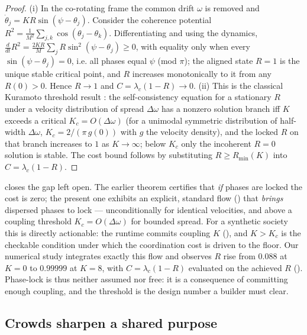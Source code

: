 \documentclass[11pt,twocolumn,a4paper]{article}
\newcommand{\Ord}{R}                 %
\begin{document}
\begin{proof}
(i) In the co-rotating frame the common drift $\omega$ is removed and
$\dot\theta_j=K\Ord\sin(\psi-\theta_j)$. Consider the coherence potential
$\Ord^2=\frac1{M^2}\sum_{j,k}\cos(\theta_j-\theta_k)$. Differentiating and
using the dynamics,
$\frac{d}{dt}\Ord^2=\frac{2K\Ord}{M}\sum_j\Ord\sin^2(\psi-\theta_j)\ge0$,
with equality only when every $\sin(\psi-\theta_j)=0$, i.e. all phases equal
$\psi$ (mod $\pi$); the aligned state $\Ord=1$ is the unique stable
critical point, and $\Ord$ increases monotonically to it from any
$\Ord(0)>0$. Hence $\Ord\to1$ and $C=\lambda_c(1-\Ord)\to0$. (ii) This is
the classical Kuramoto threshold result \cite{strogatz2000,acebron2005}:
the self-consistency equation for a stationary $\Ord$ under a velocity
distribution of spread $\Delta\omega$ has a nonzero solution branch iff
$K$ exceeds a critical $K_c=O(\Delta\omega)$ (for a unimodal symmetric
distribution of half-width $\Delta\omega$, $K_c=2/(\pi \,g(0))$ with $g$ the
velocity density), and the locked $\Ord$ on that branch increases to $1$ as
$K\to\infty$; below $K_c$ only the incoherent $\Ord=0$ solution is stable.
The cost bound follows by substituting $\Ord\ge\Ord_{\min}(K)$ into
$C=\lambda_c(1-\Ord)$.
\end{proof}

\begin{remark}
\label{rem:lock-commitment}
 closes the gap  left open. The
earlier theorem certifies that \emph{if} phases are locked the cost is
zero; the present one exhibits an explicit, standard flow
() that \emph{brings} dispersed phases to lock ---
unconditionally for identical velocities, and above a coupling threshold
$K_c=O(\Delta\omega)$ for bounded spread. For a synthetic society this is
directly actionable: the runtime commits coupling $K$ (), and
$K>K_c$ is the checkable condition under which the coordination cost is
driven to the floor. Our numerical study integrates exactly this flow and
observes $\Ord$ rise from $0.088$ at $K=0$ to $0.99999$ at $K=8$, with
$C=\lambda_c(1-\Ord)$ evaluated on the achieved $\Ord$
(). Phase-lock is thus neither assumed nor free: it is
a consequence of committing enough coupling, and the threshold is the
design number a builder must clear.
\end{remark}

\subsection{Crowds sharpen a shared purpose}
\end{document}
